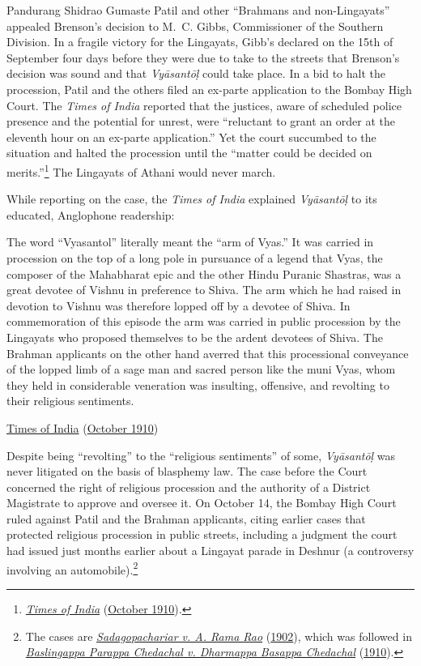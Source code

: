 Pandurang Shidrao Gumaste Patil and other “Brahmans and non-Lingayats” appealed Brenson’s decision to M. C. Gibbs, Commissioner of the Southern Division. In a fragile victory for the Lingayats, Gibb’s declared on the 15th of September  \Dash  four days before they were due to take to the streets  \Dash  that Brenson’s decision was sound and that \emph{Vyāsantōḷ} could take place. In a bid to halt the procession, Patil and the others filed an ex-parte application to the Bombay High Court. The \emph{Times of India} reported that the justices, aware of scheduled police presence and the potential for unrest, were “reluctant to grant an order at the eleventh hour on an ex-parte application.” Yet the court succumbed to the situation and halted the procession until the “matter could be decided on merits.”\footnote{%
\hyperref[ToI1910a]{\emph{Times of India}} (\hyperref[ToI1910a]{October 1910}).
}
 The Lingayats of Athani would never march.


While reporting on the case, the \emph{Times of India} explained \emph{Vyāsantōḷ} to its educated, Anglophone readership: 

\begin{pullquote}
The word “Vyasantol” literally meant the “arm of Vyas.” It was carried in procession on the top of a long pole in pursuance of a legend that Vyas, the composer of the Mahabharat epic and the other Hindu Puranic Shastras, was a great devotee of Vishnu in preference to Shiva. The arm which he had raised in devotion to Vishnu was therefore lopped off by a devotee of Shiva. In commemoration of this episode the arm was carried in public procession by the Lingayats who proposed themselves to be the ardent devotees of Shiva. The Brahman applicants on the other hand averred that this processional conveyance of the lopped limb of a sage man and sacred person like the muni Vyas, whom they held in considerable veneration was insulting, offensive, and revolting to their religious sentiments.


\medskip\hfill\begin{minipage}{0.9\textwidth}\small\hfill
\hyperref[ToI1910a]{Times of India} (\hyperref[ToI1910a]{October 1910})\end{minipage}\hspace{2em}
\end{pullquote}

Despite being “revolting” to the “religious sentiments” of some, \emph{Vyāsantōḷ} was never litigated on the basis of blasphemy law. The case before the Court concerned the right of religious procession and the authority of a District Magistrate to approve and oversee it. On  October 14, the Bombay High Court ruled against Patil and the Brahman applicants, citing earlier cases that protected religious procession in public streets, including a judgment the court had issued just months earlier about a Lingayat parade in Deshnur (a controversy involving an automobile).\footnote{%
The cases are \hyperref[Sadagopachariar]{\emph{Sadagopachariar v. A. Rama Rao}} (\hyperref[Sadagopachariar]{1902}), which was followed in \hyperref[Baslingappa]{\emph{Baslingappa Parappa Chedachal v. Dharmappa Basappa Chedachal}} (\hyperref[Baslingappa]{1910}).
}



